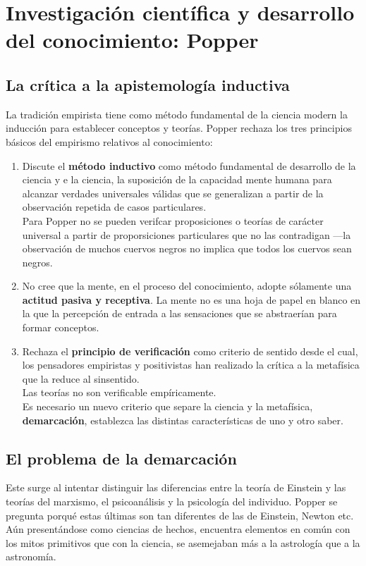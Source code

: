 \documentclass[a4paper, 11pt, twocolumn, spanish]{article}
\begin{document}
\section{Investigación científica y desarrollo del conocimiento: Popper}
\label{sec:org7d551d0}
\subsection{La crítica a la apistemología inductiva}
\label{sec:orgdef81cd}
La tradición empirista tiene como método fundamental de la ciencia
modern la inducción para establecer conceptos y teorías. Popper
rechaza los tres principios básicos del empirismo relativos al
conocimiento:
\begin{enumerate}
\item Discute el \textbf{método inductivo} como método fundamental de desarrollo
de la ciencia y e la ciencia, la suposición de la capacidad mente
humana para alcanzar verdades universales válidas que se
generalizan a partir de la observación repetida de casos
particulares.\\
Para Popper no se pueden verifcar proposiciones o teorías de
carácter universal a partir de proporsiciones particulares que no
las contradigan —la observación de muchos cuervos negros no
implica que todos los cuervos sean negros.
\item No cree que la mente, en el proceso del conocimiento, adopte
sólamente una \textbf{actitud pasiva y receptiva}. La mente no es una hoja
de papel en blanco en la que la percepción de entrada a las
sensaciones que se abstraerían para formar conceptos.
\item Rechaza el \textbf{principio de verificación} como criterio de sentido
desde el cual, los pensadores empiristas y positivistas han
realizado la crítica a la metafísica que la reduce al
sinsentido.\\
Las teorías no son verificable empíricamente.\\
Es necesario un nuevo criterio que separe la ciencia y la
metafísica, \textbf{demarcación}, establezca las distintas características de uno y
otro saber.
\end{enumerate}

\subsection{El problema de la demarcación}
\label{sec:orgfc49306}
Este surge al intentar distinguir las diferencias entre la teoría de
Einstein y las teorías del marxismo, el psicoanálisis y la psicología
del individuo. Popper se pregunta porqué estas últimas son tan
diferentes de las de Einstein, Newton etc. Aún presentándose como
ciencias de hechos, encuentra elementos en común con los mitos
primitivos que con la ciencia, se asemejaban más a la astrología que a
la astronomía.\\
\end{document}
